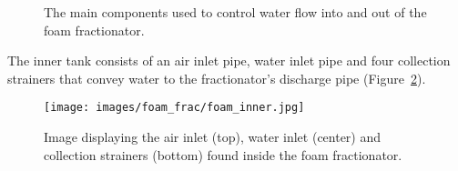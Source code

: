 \documentclass[
  letterpaper,
  DIV=11,
  numbers=noendperiod]{scrreprt}
\begin{document}
\begin{figure}[H]

\begin{minipage}[t]{0.33\linewidth}

{\centering 


}

\end{minipage}%
%
\begin{minipage}[t]{0.33\linewidth}

{\centering 


}

\end{minipage}%
%
\begin{minipage}[t]{0.33\linewidth}

{\centering 


}

\end{minipage}%

\caption{\label{fig-foamcomp}The main components used to control water
flow into and out of the foam fractionator.}

\end{figure}

The inner tank consists of an air inlet pipe, water inlet pipe and four
collection strainers that convey water to the fractionator's discharge
pipe (Figure~\ref{fig-foaminner}).

\begin{figure}[H]

{\centering \texttt{[image: images/foam\_frac/foam\_inner.jpg]}

}

\caption{\label{fig-foaminner}Image displaying the air inlet (top),
water inlet (center) and collection strainers (bottom) found inside the
foam fractionator.}

\end{figure}
\end{document}
